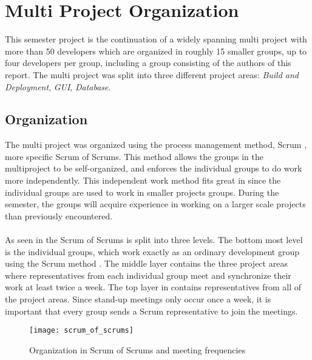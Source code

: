 
\section{Multi Project Organization}
\label{sec:multi_project_organization}

This semester project is the continuation of a widely spanning multi project with more than 50 developers which are organized in roughly 15 smaller groups, up to four developers per group, including a group consisting of the authors of this report. The multi project was split into three different project areas: \emph{Build and Deployment}, \emph{GUI}, \emph{Database}. 

\subsection{Organization}
The multi project was organized using the process management method, Scrum \parencite{scrum}, more specific Scrum of Scrums. This method allows the groups in the multiproject to be self-organized, and enforces the individual groups to do work more independently. This independent work method fits great in since the individual groups are used to work in smaller projects groups. During the semester, the groups will acquire experience in working on a larger scale projects than previously encountered. 
\\\\
As seen in  the Scrum of Scrums is split into three levels. The bottom most level is the individual groups, which work exactly as an ordinary development group using the Scrum method . The middle layer contains the three project areas where representatives from each individual group meet and synchronize their work at least twice a week. The top layer in  contains representatives from all of the project areas. Since stand-up meetings only occur once a week, it is important that every group sends a Scrum representative to join the meetings.

\begin{figure}[!htbp]
  \centering
    \texttt{[image: scrum\_of\_scrums]}
    \caption{Organization in Scrum of Scrums and meeting frequencies}
    \label{fig:scrum_of_scrums}
\end{figure}


